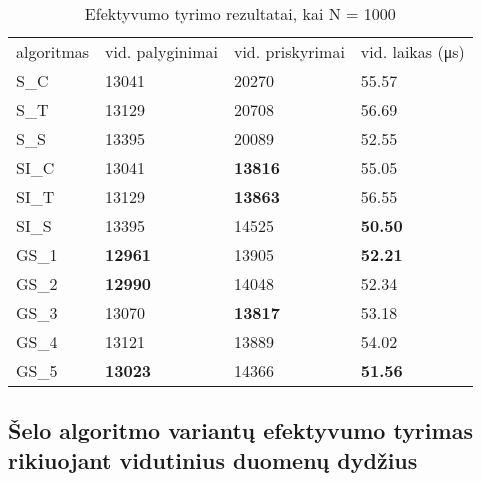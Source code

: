 \documentclass{VUMIFInfKursinis}
\begin{document}
\begin{table}[H]
  \caption{Efektyvumo tyrimo rezultatai, kai N = 1000}
  \label{results_1000}
  \centering
  \begin{tabular}{@{}llll@{}}
  algoritmas & vid. palyginimai                       & vid. priskyrimai                       & vid. laikas (μs)                       \\
  S\_C       & 13041                                  & 20270                                  & 55.57                                  \\
  S\_T       & 13129                                  & 20708                                  & 56.69                                  \\
  S\_S       & 13395                                  & 20089                                  & 52.55                                  \\
  SI\_C      & 13041                                  & \cellcolor[HTML]{70AD47}\textbf{13816} & 55.05                                  \\
  SI\_T      & 13129                                  & \cellcolor[HTML]{70AD47}\textbf{13863} & 56.55                                  \\
  SI\_S      & 13395                                  & 14525                                  & \cellcolor[HTML]{70AD47}\textbf{50.50} \\
  GS\_1      & \cellcolor[HTML]{70AD47}\textbf{12961} & 13905                                  & \cellcolor[HTML]{70AD47}\textbf{52.21} \\
  GS\_2      & \cellcolor[HTML]{70AD47}\textbf{12990} & 14048                                  & 52.34                                  \\
  GS\_3      & 13070                                  & \cellcolor[HTML]{70AD47}\textbf{13817} & 53.18                                  \\
  GS\_4      & 13121                                  & 13889                                  & 54.02                                  \\
  GS\_5      & \cellcolor[HTML]{70AD47}\textbf{13023} & 14366                                  & \cellcolor[HTML]{70AD47}\textbf{51.56}
  \end{tabular}
\end{table}


\subsection{Šelo algoritmo variantų efektyvumo tyrimas rikiuojant vidutinius duomenų dydžius}
\end{document}
